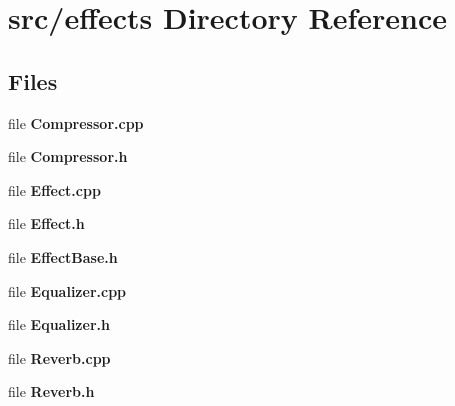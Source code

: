 \section{src/effects Directory Reference}
\label{dir_191f852b87741474e2df76292b1f55c1}
\subsection*{Files}
\begin{DoxyCompactItemize}
\item 
file \textbf{ Compressor.\+cpp}
\item 
file \textbf{ Compressor.\+h}
\item 
file \textbf{ Effect.\+cpp}
\item 
file \textbf{ Effect.\+h}
\item 
file \textbf{ Effect\+Base.\+h}
\item 
file \textbf{ Equalizer.\+cpp}
\item 
file \textbf{ Equalizer.\+h}
\item 
file \textbf{ Reverb.\+cpp}
\item 
file \textbf{ Reverb.\+h}
\end{DoxyCompactItemize}
